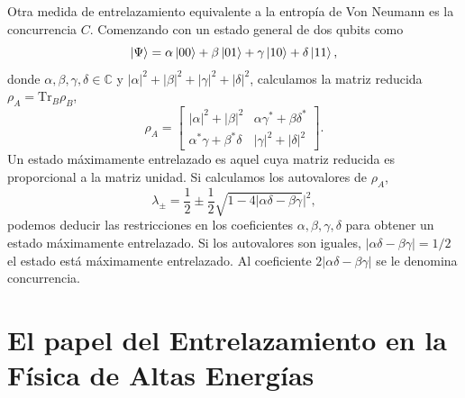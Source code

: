 \documentclass{article}
\theoremstyle{plain}
\theoremstyle{definition}
\begin{document}
	Otra medida de entrelazamiento equivalente a la entropía de Von Neumann es la concurrencia \(C\). Comenzando con un estado general de dos qubits como \[\ket{\Psi} = \alpha\ket{00}+\beta\ket{01}+\gamma\ket{10} + \delta\ket{11}, \] donde \(\alpha,\beta,\gamma,\delta \in \mathbb{C} \) y \(|\alpha|^2+|\beta|^2+|\gamma|^2+|\delta|^2\), calculamos la matriz reducida \(\rho_A = \mathrm{Tr}_B\rho_B \), \[\rho_A =
	\begin{bmatrix}
	|\alpha|^2 + |\beta|^2 & \alpha\gamma^* + \beta\delta^* \\
	\alpha^*\gamma+\beta^*\delta & |\gamma|^2 + |\delta|^2
	\end{bmatrix} \text{.}\] 
	Un estado máximamente entrelazado es aquel cuya matriz reducida es proporcional a la matriz unidad. Si calculamos los autovalores de \(\rho_A\), \[\lambda_{\pm}= \frac{1}{2}\pm\frac{1}{2}\sqrt{1-4|\alpha\delta-\beta\gamma}|^2,\] podemos deducir las restricciones en los coeficientes \(\alpha,\beta,\gamma,\delta \) para obtener un estado máximamente entrelazado. Si los autovalores son iguales, \(|\alpha\delta - \beta\gamma|= 1/2 \) el estado está máximamente entrelazado. Al coeficiente \(2|\alpha\delta - \beta\gamma|\) se le denomina concurrencia.
	\section{El papel del Entrelazamiento en la Física de Altas Energías}
	
\end{document}
